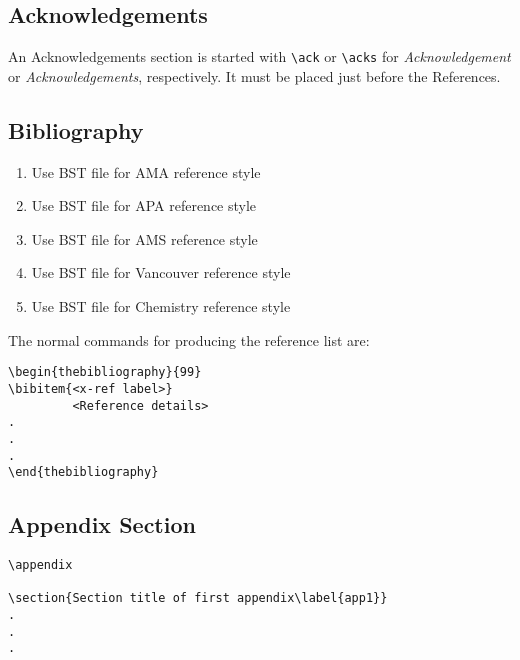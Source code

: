 \documentclass[AMS,STIX1COL]{WileyNJD-v2}
\begin{document}
\subsection{Acknowledgements} An Acknowledgements section is started with \verb"\ack" or
\verb"\acks" for \textit{Acknowledgement} or
\textit{Acknowledgements}, respectively. It must be placed just
before the References.

\subsection{Bibliography}

\begin{enumerate}[1]
\item Use \verb"" BST file for AMA reference style
\item Use \verb"" BST file for APA reference style
\item Use \verb"" BST file for AMS reference style
\item Use \verb"" BST file for Vancouver reference style
\item Use \verb"" BST file for Chemistry reference style
\end{enumerate}

The normal commands for producing the reference list are:

\begin{verbatim}
\begin{thebibliography}{99}
\bibitem{<x-ref label>}
         <Reference details>
.
.
.
\end{thebibliography}
\end{verbatim}

\subsection{Appendix Section}

\begin{verbatim}
\appendix

\section{Section title of first appendix\label{app1}}
.
.
.

\end{verbatim}
\end{document}
